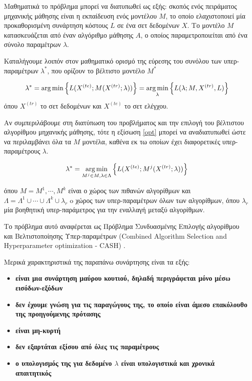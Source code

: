  	Μαθηματικά το πρόβλημα μπορεί να διατυπωθεί ως εξής: σκοπός ενός πειράματος μηχανικής μάθησης είναι η εκπαίδευση ενός μοντέλου $M$, το οποίο ελαχιστοποιεί μία προκαθορισμένη συνάρτηση κόστους $L$ σε ένα σετ δεδομένων $X$. Το μοντέλο $Μ$ κατασκευάζεται από έναν αλγόριθμο μάθησης $Α$, ο οποίος παραμετροποιείται από ένα σύνολο παραμέτρων $\lambda$.
 	
 	Καταλήγουμε λοιπόν στον μαθηματικό ορισμό της εύρεσης του συνόλου των υπερ-παραμέτρων $\lambda^*$, που ορίζουν το βέλτιστο μοντέλο $M^*$
 	
 	
 	\begin{equation}
 	\label{opt}
 	\lambda^* = \operatorname*{arg\,min} \left \{L(X^{(te)}; M(X^{(tr)}; \lambda)) \right \} = \operatorname*{arg\,min}_{\lambda} \left \{L(\lambda; M, X^{(tr)}, L) \right \}
 	\end{equation} 
 	όπου $X^{(tr)}$ το σετ δεδομένων και $X^{(te)}$ το σετ ελέγχου.
 	
 	Αν συμπεριλάβουμε στη διατύπωση του προβλήματος και την επιλογή του βέλτιστου αλγορίθμου μηχανικής μάθησης, τότε η εξίσωση \ref{opt} μπορεί να αναδιατυπωθεί ώστε να περιλαμβάνει όλα τα $M$ μοντέλα, καθένα εκ τω οποίων έχει διαφορετικές υπερ-παραμέτρους $\lambda$. 
 	
 	\begin{equation}
 	\label{optCash}
 	\lambda^* = \operatorname*{arg\,min}_{M^{j} \in M, \lambda \in \Lambda} \left \{L(X^{(te)}; M^{j}(X^{(tr)}; \lambda)) \right \}
 	\end{equation} 
 	
 	όπου $M ={M^{1}, \cdots, M^{k}}$ είναι ο χώρος των πιθανών αλγορίθμων και $ \Lambda = \Lambda^{1} \cup \cdots \cup \Lambda^{k} \cup {\lambda_r} $ o χώρος των υπερ-παραμέτρων όλων των αλγορίθμων, όπου $\lambda_r$ μία βοηθητική υπερ-παράμετρος για την εναλλαγή μεταξύ αλγορίθμων.
 	
 	Το πρόβλημα αυτό αναφέρεται ως Πρόβλημα Συνδυασμένης Επιλογής αλγορίθμου και Βελτιστοποίησης Υπερ-παραμέτρων (Combined Algorithm Selection and Hyperparameter optimization - CASH) \citep{DBLP:journals/corr/LoshchilovH16}.
 	
	Μερικά χαρακτηριστικά της παραπάνω συνάρτησης είναι τα εξής:
	\begin{itemize}
		\item \textbf{είναι μια συνάρτηση μαύρου κουτιού, δηλαδή περιγράφεται μόνο μέσω εισόδων-εξόδων}
		\item \textbf{δεν έχουμε γνώση για τις παραγώγους της, το οποίο είναι άμεσο επακόλουθο της προηγούμενης πρότασης}
		\item \textbf{είναι μη-κυρτή} 
		\item \textbf{δεν εξαρτάται εξίσου από όλες τις παραμέτρους} 
		\item \textbf{ο υπολογισμός της για δεδομένο $\lambda$ είναι υπολογιστικά και χρονικά απαιτητικός}
	\end{itemize}
	
